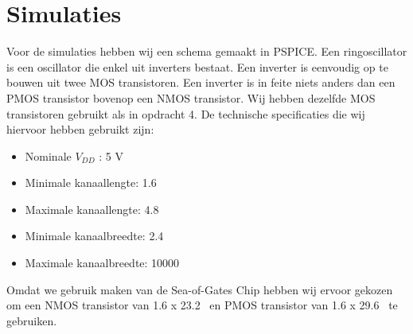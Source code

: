 \documentclass{scrartcl}  %
\begin{document}
\section{Simulaties}
Voor de simulaties hebben wij een schema gemaakt in PSPICE. Een ringoscillator is een oscillator die enkel uit inverters bestaat. Een inverter is eenvoudig op te bouwen uit twee MOS transistoren. Een inverter is in feite niets anders dan een PMOS transistor bovenop een NMOS transistor. Wij hebben dezelfde MOS transistoren gebruikt als in opdracht 4. De technische specificaties die wij hiervoor hebben gebruikt zijn:
\begin{itemize}
        \item Nominale $V_{DD}$ : 5 V
        \item Minimale kanaallengte: 1.6  \micro\meter\
        \item Maximale kanaallengte: 4.8 \micro\meter\
        \item Minimale kanaalbreedte: 2.4 \micro\meter\
        \item Maximale kanaalbreedte: 10000 \micro\meter\
\end{itemize}
Omdat we gebruik maken van de Sea-of-Gates Chip hebben wij ervoor gekozen om een NMOS transistor van 1.6 x 23.2 \micro\meter\ en PMOS transistor van 1.6 x 29.6 \micro\meter\ te gebruiken.
\end{document}
